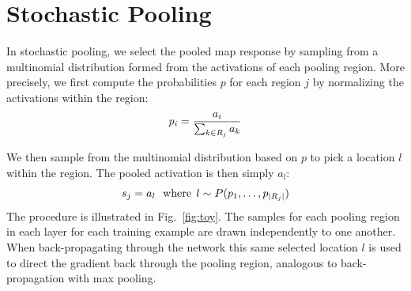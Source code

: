 \documentclass{article} %
\def\BE{\vspace{-0.0mm}\begin{equation}}
\def\EE{\vspace{-0.0mm}\end{equation}}
\newcommand{\fig}[1]{Fig.~\ref{fig:#1}}
\begin{document}

\section{Stochastic Pooling}

In stochastic pooling, we select the pooled map response by sampling
from a multinomial distribution formed from the activations of each
pooling region. More precisely, we first compute the probabilities $p$
for each region $j$ by normalizing the activations within the
region:
\BE
p_i = \frac{a_i}{\sum_{k \in R_j} a_k}
\label{eqn:multinomial}
\EE

We then sample from the multinomial distribution based on
$p$ to pick a location $l$ within the region. The pooled activation is
then simply $a_l$:
\BE
 s_j = a_l \:\:\: \text{where} \:\: l \sim P(p_1,\ldots,p_{|R_j|})
\EE
The procedure is illustrated in \fig{toy}. The samples for each
pooling region in each layer for each training example are drawn
independently to one another. When back-propagating through the network
this same selected location $l$ is used to direct the gradient back
through the pooling region, analogous to back-propagation with max pooling.



\end{document}
